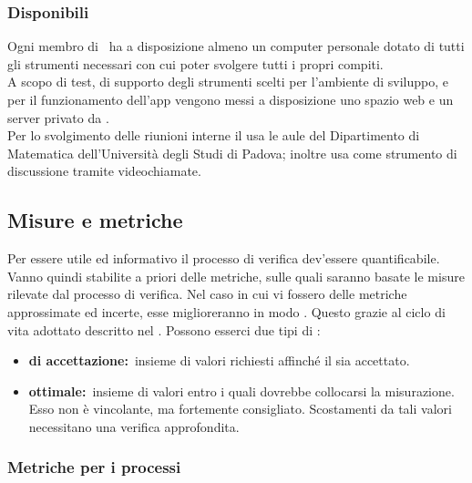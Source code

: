 		\subsubsection{Disponibili}
			Ogni membro di \AUTORE\ ha a disposizione almeno un computer personale dotato di tutti gli strumenti necessari con cui poter svolgere tutti i propri compiti. \\
			A scopo di test, di supporto degli strumenti scelti per l'ambiente di sviluppo, e per il funzionamento dell'app vengono messi a disposizione uno spazio web e un server privato da \PROPONENTE. \\
			Per lo svolgimento delle riunioni interne il  usa le aule del Dipartimento di Matematica dell'Università degli Studi di Padova; inoltre usa  come strumento di discussione tramite videochiamate.
	\subsection{Misure e metriche}
		\label{sec:3.7}
		Per essere utile ed informativo il processo di verifica dev'essere quantificabile. Vanno quindi stabilite a priori delle metriche, sulle quali saranno basate le misure rilevate dal processo di verifica. Nel caso in cui vi fossero delle metriche approssimate ed incerte, esse miglioreranno in modo . Questo grazie al ciclo di vita adottato descritto nel \PPdoc. Possono esserci due tipi di :
		\begin{itemize}
			\item \textbf{ di accettazione:}\ insieme di valori richiesti affinché il  sia accettato.
			\item \textbf{ ottimale:}\ insieme di valori entro i quali dovrebbe collocarsi la misurazione. Esso non è vincolante, ma fortemente consigliato. Scostamenti da tali valori necessitano una verifica approfondita.
		\end{itemize}
		\subsubsection{Metriche per i processi}
			\label{sec:3.7.1}
